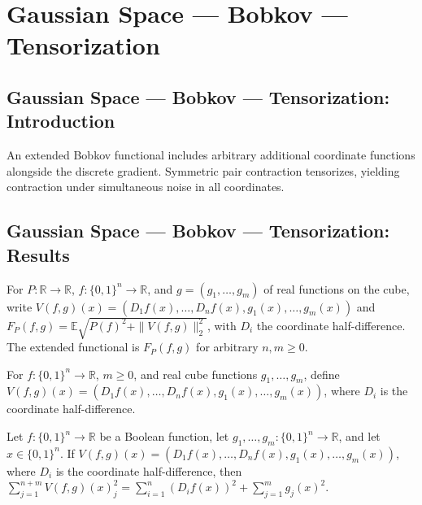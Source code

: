 \section{Gaussian Space --- Bobkov --- Tensorization}
\subsection*{Gaussian Space --- Bobkov --- Tensorization: Introduction}
An extended Bobkov functional includes arbitrary additional coordinate functions alongside the discrete gradient. Symmetric pair contraction tensorizes, yielding contraction under simultaneous noise in all coordinates.

\subsection*{Gaussian Space --- Bobkov --- Tensorization: Results}

\begin{definition}
\leanok
{}
For $P:\mathbb R\to\mathbb R$, $f:\{0,1\}^n\to\mathbb R$, and $g=(g_1,\ldots,g_m)$ of real functions on the cube, write $V(f,g)(x)=(D_1f(x),\ldots,D_nf(x),g_1(x),\ldots,g_m(x))$ and $F_P(f,g)=\mathbb E\sqrt{P(f)^2+\|V(f,g)\|_2^2}$, with $D_i$ the coordinate half-difference. The extended functional is $F_P(f,g)$ for arbitrary $n,m\ge0$.
\end{definition}

\begin{definition}
\leanok
{}
For $f:\{0,1\}^n\to\mathbb R$, $m\ge0$, and real cube functions $g_1,\ldots,g_m$, define $V(f,g)(x)=(D_1f(x),\ldots,D_nf(x),g_1(x),\ldots,g_m(x))$, where $D_i$ is the coordinate half-difference.
\end{definition}

\begin{lemma}
\leanok
{}
Let $f:\{0,1\}^n\to\mathbb R$ be a Boolean function, let
$g_1,\ldots,g_m:\{0,1\}^n\to\mathbb R$, and let $x\in\{0,1\}^n$. If
$V(f,g)(x)=(D_1f(x),\ldots,D_nf(x),g_1(x),\ldots,g_m(x))$, where $D_i$ is the coordinate
half-difference, then
$\sum_{j=1}^{n+m}V(f,g)(x)_j^2=\sum_{i=1}^n(D_if(x))^2+\sum_{j=1}^m g_j(x)^2$.
\end{lemma}

